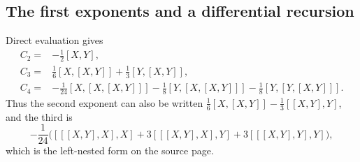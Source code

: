 \documentclass[11pt]{article}
\theoremstyle{definition}
\theoremstyle{remark}
\numberwithin{equation}{section}
\begin{document}
\subsection{The first exponents and a differential recursion}
Direct evaluation gives
\begin{align}
 C_2={}&-\frac12[X,Y],\label{eq:c2}\\
 C_3={}&\frac16[X,[X,Y]]+\frac13[Y,[X,Y]],\label{eq:c3}\\
 C_4={}&-\frac1{24}[X,[X,[X,Y]]]
         -\frac18[Y,[X,[X,Y]]]
         -\frac18[Y,[Y,[X,Y]]].\label{eq:c4}
\end{align}
Thus the second exponent can also be written
$\frac16[X,[X,Y]]-\frac13[[X,Y],Y]$, and the third is
\begin{equation}\label{eq:c4left}
 -\frac1{24}\bigl([[[X,Y],X],X]
            +3[[[X,Y],X],Y]+3[[[X,Y],Y],Y]\bigr),
\end{equation}
which is the left-nested form on the source page.
\end{document}
